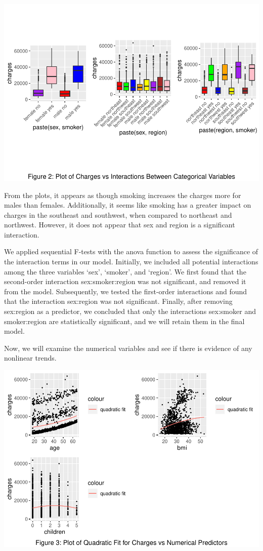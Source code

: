 \documentclass[
  12pt,
]{article}
\begin{document}
\includegraphics{finalproject_files/figure-latex/unnamed-chunk-11-1.pdf}

From the plots, it appears as though smoking increases the charges more
for males than females. Additionally, it seems like smoking has a
greater impact on charges in the southeast and southwest, when compared
to northeast and northwest. However, it does not appear that sex and
region is a significant interaction.

We applied sequential F-tests with the anova function to assess the
significance of the interaction terms in our model. Initially, we
included all potential interactions among the three variables `sex',
`smoker', and `region'. We first found that the second-order interaction
sex:smoker:region was not significant, and removed it from the model.
Subsequently, we tested the first-order interactions and found that the
interaction sex:region was not significant. Finally, after removing
sex:region as a predictor, we concluded that only the interactions
sex:smoker and smoker:region are statistically significant, and we will
retain them in the final model.

Now, we will examine the numerical variables and see if there is
evidence of any nonlinear trends.

\includegraphics{finalproject_files/figure-latex/unnamed-chunk-16-1.pdf}
\end{document}
